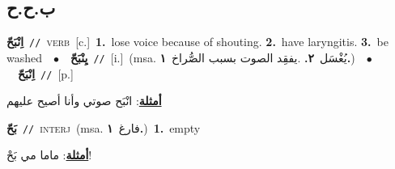 \documentclass[10pt,a4paper,twoside]{article} %
\begin{document}
\begin{multicols}{2}
{{{{{\vspace{-3mm}
\subsection*{\color{blue}\foreignlanguage{arabic}{ب.ح.ح}\color{blue}{}} 

{\setlength\topsep{0pt}\textbf{\foreignlanguage{arabic}{اِنْبَحّ}}\ {\color{gray}\texttt{//}\color{black}}\ \textsc{verb}\ [c.]\ \textbf{1.}~lose voice because of shouting.  \textbf{2.}~have laryngitis.  \textbf{3.}~be washed\ \ $\bullet$\ \ \setlength\topsep{0pt}\textbf{\foreignlanguage{arabic}{يِنْبَحّ}}\ {\color{gray}\texttt{//}\color{black}}\ [i.]\ \color{gray}(msa. \foreignlanguage{arabic}{يُغْسَل}~\foreignlanguage{arabic}{\textbf{٢.}}  .\foreignlanguage{arabic}{يفقِد الصوت بسبب الصُّراخ}~\foreignlanguage{arabic}{\textbf{١.}})\color{black}\ \ $\bullet$\ \ \setlength\topsep{0pt}\textbf{\foreignlanguage{arabic}{اِنْبَحّ}}\ {\color{gray}\texttt{//}\color{black}}\ [p.]\  \begin{flushright}\color{gray}\foreignlanguage{arabic}{\textbf{\underline{\foreignlanguage{arabic}{أمثلة}}}: انْبَح صوتي وأنا أصيح عليهم}\end{flushright}\color{black}} \vspace{2mm}

{\setlength\topsep{0pt}\textbf{\foreignlanguage{arabic}{بَحّ}}\ {\color{gray}\texttt{//}\color{black}}\ \textsc{interj}\ \color{gray}(msa. \foreignlanguage{arabic}{فارغ}~\foreignlanguage{arabic}{\textbf{١.}})\color{black}\ \textbf{1.}~empty\  \begin{flushright}\color{gray}\foreignlanguage{arabic}{\textbf{\underline{\foreignlanguage{arabic}{أمثلة}}}: ماما مي بَحْ!}\end{flushright}\color{black}} \vspace{2mm}

}}}}}
\end{multicols}
\end{document}
